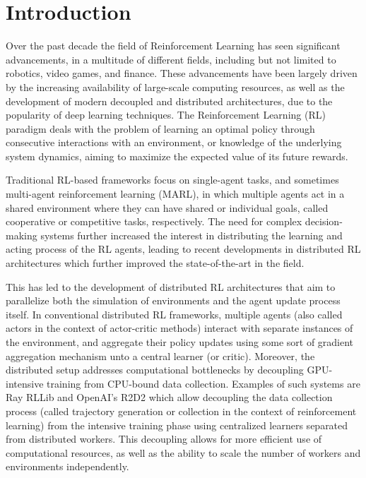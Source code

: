 
\chapter{Introduction}
\label{ch:introduction}

Over the past decade the field of Reinforcement Learning has seen significant advancements, in a multitude of
different fields, including but not limited to robotics, video games, and finance.
These advancements have been largely driven by the increasing availability of large-scale computing resources, as well as
the development of modern decoupled and distributed architectures, due to the popularity of deep learning techniques.
The Reinforcement Learning (RL) paradigm deals with the problem of learning an optimal
policy through consecutive interactions with an environment, or knowledge of the underlying system dynamics,
aiming to maximize the expected value of its future rewards.

Traditional RL-based frameworks focus on single-agent tasks, and sometimes multi-agent reinforcement learning (MARL),
in which multiple agents act in a shared environment where they can have shared or individual goals, called cooperative or competitive tasks, respectively.
The need for complex decision-making systems further increased the interest in distributing
the learning and acting process of the RL agents, leading to recent developments in distributed RL architectures
which further improved the state-of-the-art in the field.

This has led to the development of distributed RL architectures that aim to parallelize both the simulation of environments and the agent update process itself.
In conventional distributed RL frameworks, multiple agents (also called actors in the context of actor-critic methods) interact with separate instances of the environment,
and aggregate their policy updates using some sort of gradient aggregation mechanism unto a central learner (or critic).
Moreover, the distributed setup addresses computational bottlenecks by decoupling GPU-intensive training from CPU-bound data collection.
Examples of such systems are Ray RLLib and OpenAI's R2D2 which allow decoupling the data collection process (called trajectory generation or collection
in the context of reinforcement learning) from the intensive training phase using centralized learners separated from distributed workers.
This decoupling allows for more efficient use of computational resources, as well as the ability to scale the number of workers and environments independently.

